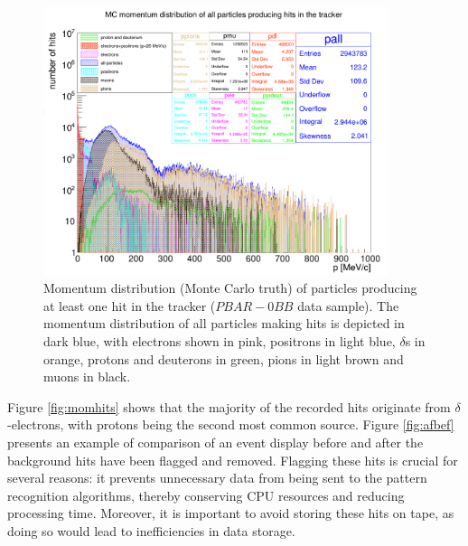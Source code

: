 \begin{figure}[!h]
    \centering
    \includegraphics[width =0.9\textwidth]{figures/png/Screenshot_20240815_124710.png}
\caption[Monte Carlo momentum distribution 
of particles producing hits in the Mu2e 
tracker ($PBAR-0BB$ data sample).]{
    Momentum distribution (Monte Carlo truth) 
    of particles producing at 
   least one hit in the tracker 
   ($PBAR-0BB$ data sample). 
   The momentum distribution 
   of all particles making hits is 
   depicted in dark blue, with electrons 
   shown in pink, positrons in light 
   blue, $\delta$s in orange, protons 
   and deuterons in green, pions in 
   light brown and muons 
   in black. }
   \label{fig:pbar}
\end{figure}
Figure \ref{fig:momhits} shows that 
the majority of the recorded hits 
originate from $\delta$-electrons, 
with protons being the second most 
common source. Figure \ref{fig:afbef} 
presents an example of comparison of an 
event display before and after the background 
hits have been flagged and removed.  
Flagging these hits is crucial for 
several reasons: it prevents unnecessary 
data from being sent to the pattern 
recognition algorithms, thereby conserving 
CPU resources and reducing processing 
time. Moreover, it is important to avoid 
storing these hits on tape, as doing so 
would lead to inefficiencies in data storage.


